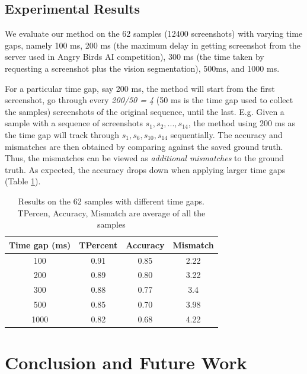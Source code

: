 \documentclass[letterpaper]{article}
\begin{document}
\subsection{Experimental Results}

We evaluate our method on the 62 samples (12400 screenshots) with varying time gaps, namely 100 ms, 200 ms (the maximum delay in getting screenshot from the server used in Angry Birds AI competition), 300 ms (the time taken by requesting a screenshot plus the vision segmentation), 500ms, and 1000 ms.

For a particular time gap, say 200 ms, the method will start from the first screenshot, go through every \emph{200/50 = 4} (50 ms is the time gap used to collect the samples) screenshots of the original sequence, until the last. E.g. Given a sample with a sequence of screenshots $s_1, s_2, ..., s_{14}$, the method using 200 ms as the time gap will track through $s_1, s_6, s_{10}, s_{14}$ sequentially. The accuracy and mismatches are then obtained by comparing against the saved ground truth. Thus, the mismatches can be viewed as \emph{additional mismatches} to the ground truth. As expected, the accuracy drops down when applying larger time gaps (Table \ref{empiResults_2}). 

\vspace{-5mm}
\begin{table}[h!]
\caption{Results on the 62 samples with different time gaps. TPercen, Accuracy, Mismatch are average of all the samples }\label{empiResults_2}
\centering
\begin{tabular}{c|c|c|c}
\hline
Time gap (ms) & TPercent & Accuracy & Mismatch\\
\hline
100 & 0.91 & 0.85 & 2.22\\
200 & 0.89 & 0.80 & 3.22\\
300 & 0.88 & 0.77 & 3.4\\
500 & 0.85 & 0.70 & 3.98\\
1000 & 0.82 & 0.68 & 4.22\\
\hline
\end{tabular}
\end{table}
\vspace{-3mm}

\section{Conclusion and Future Work}
\end{document}
